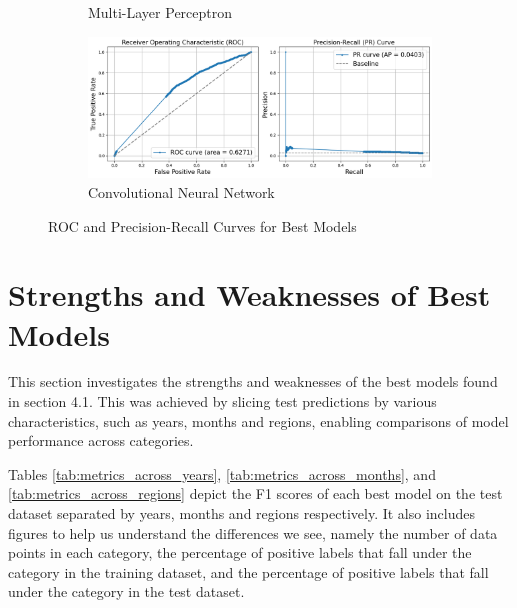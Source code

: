 \documentclass[a4paper,11pt]{report}
\begin{document}
\begin{figure}[H]
\begin{subfigure}[b]{0.45\textwidth}
    \caption{Multi-Layer Perceptron}
    \label{fig:roc_pr_mlp}
\end{subfigure}
\hfill
\begin{subfigure}[b]{0.45\textwidth} %
    \includegraphics[width=\textwidth]{images/roc_pr_graph_cnn_neg10.png}
    \caption{Convolutional Neural Network}
    \label{fig:roc_pr_cnn}
\end{subfigure}
\caption{ROC and Precision-Recall Curves for Best Models}
\label{fig:roc_pr}
\end{figure}


\section{Strengths and Weaknesses of Best Models}
\label{sec:Strengths and Weaknesses of Best Models}

This section investigates the strengths and weaknesses of the best models found in section 4.1. This was achieved by slicing test predictions by various characteristics, such as years, months and regions, enabling comparisons of model performance across categories. 

Tables \ref{tab:metrics_across_years}, \ref{tab:metrics_across_months}, and \ref{tab:metrics_across_regions} depict the F1 scores of each best model on the test dataset separated by years, months and regions respectively. It also includes figures to help us understand the differences we see, namely the number of data points in each category, the percentage of positive labels that fall under the category in the training dataset, and the percentage of positive labels that fall under the category in the test dataset. 
\end{document}
